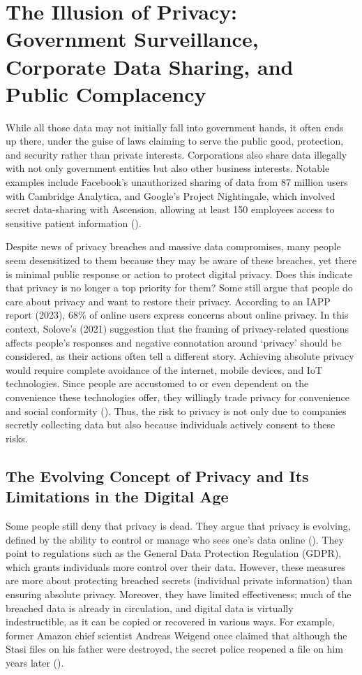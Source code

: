 \documentclass[a4paper,12pt]{article}
\begin{document}
\section{The Illusion of Privacy: Government Surveillance, Corporate Data Sharing, and Public Complacency}

While all those data may not initially fall into government hands, it often ends up there, under the guise of laws claiming to serve the public good, protection, and security rather than private interests. Corporations also share data illegally with not only government entities but also other business interests. Notable examples include Facebook’s unauthorized sharing of data from 87 million users with Cambridge Analytica, and Google’s Project Nightingale, which involved secret data-sharing with Ascension, allowing at least 150 employees access to sensitive patient information (\cite{kshetri2020privacy}).

Despite news of privacy breaches and massive data compromises, many people seem desensitized to them because they may be aware of these breaches, yet there is minimal public response or action to protect digital privacy. Does this indicate that privacy is no longer a top priority for them? Some still argue that people do care about privacy and want to restore their privacy. According to an IAPP report (2023), 68\% of online users express concerns about online privacy. In this context, Solove's (2021) suggestion that the framing of privacy-related questions affects people's responses and negative connotation around ‘privacy’ should be considered, as their actions often tell a different story. Achieving absolute privacy would require complete avoidance of the internet, mobile devices, and IoT technologies. Since people are accustomed to or even dependent on the convenience these technologies offer, they willingly trade privacy for convenience and social conformity (\cite{solove2020privacy_paradox}). Thus, the risk to privacy is not only due to companies secretly collecting data but also because individuals actively consent to these risks.

\subsection{The Evolving Concept of Privacy and Its Limitations in the Digital Age}

Some people still deny that privacy is dead. They argue that privacy is evolving, defined by the ability to control or manage who sees one's data online (\cite{ormiston2023privacy}). They point to regulations such as the General Data Protection Regulation (GDPR), which grants individuals more control over their data. However, these measures are more about protecting breached secrets (individual private information) than ensuring absolute privacy. Moreover, they have limited effectiveness; much of the breached data is already in circulation, and digital data is virtually indestructible, as it can be copied or recovered in various ways. For example, former Amazon chief scientist Andreas Weigend once claimed that although the Stasi files on his father were destroyed, the secret police reopened a file on him years later (\cite{bbc2017privacy}).
\end{document}
